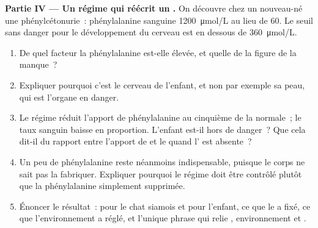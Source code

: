 \begin{problem}
\medskip
\noindent\textbf{Partie IV --- Un régime qui réécrit un .}
On découvre chez un nouveau-né une phénylcétonurie~: phénylalanine
sanguine \qty{1200}{\micro mol/L} au lieu de \num{60}. Le seuil sans
danger pour le développement du cerveau est en dessous de
\qty{360}{\micro mol/L}.
\begin{enumerate}[resume]
  \item De quel facteur la phénylalanine est-elle élevée, et quelle
         de la figure de la  manque~?
  \item Expliquer pourquoi c'est le cerveau de l'enfant, et non par
        exemple sa peau, qui est l'organe en danger.
  \item Le régime réduit l'apport de phénylalanine au cinquième de la
        normale~; le taux sanguin baisse en proportion. L'enfant est-il
        hors de danger~? Que cela dit-il du rapport entre l'apport de
         et le  quand l' est absente~?
  \item Un peu de phénylalanine reste néanmoins indispensable, puisque
        le corps ne sait pas la fabriquer. Expliquer pourquoi le régime
        doit être contrôlé plutôt que la phénylalanine simplement
        supprimée.
  \item Énoncer le résultat~: pour le chat siamois et pour l'enfant, ce
        que le  a fixé, ce que l'environnement a réglé, et
        l'unique phrase qui relie , environnement et
        .
\end{enumerate}
\end{problem}
